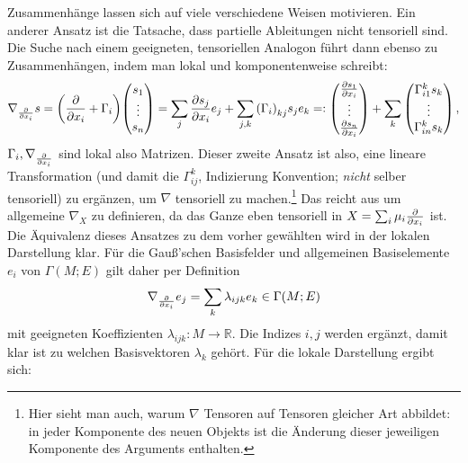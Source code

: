 \documentclass[../H_Analysis_main.tex]{subfiles}
\begin{document}
Zusammenhänge lassen sich auf viele verschiedene Weisen motivieren. Ein anderer Ansatz ist die Tatsache, dass partielle Ableitungen nicht tensoriell sind. Die Suche nach einem geeigneten, tensoriellen Analogon führt dann ebenso zu Zusammenhängen, indem man lokal und komponentenweise schreibt:
\begin{equation}
\nabla_{\pdv{x_i}} s = \qty(\pdv{x_i} + \Gamma_i) \mqty(s_1 \\ \vdots \\ s_n) = \sum_j \pdv{s_j}{x_i} e_j + \sum_{j, k} \qty(\Gamma_i)_{kj} s_j e_k =: \mqty(\pdv{s_1}{x_i} \\ \vdots \\ \pdv{s_n}{x_i}) + \sum_k \mqty(\Gamma_{i1}^k s_k \\ \vdots \\ \Gamma_{in}^k s_k) \, ,
\end{equation}
$\Gamma_i, \nabla_{\pdv{x_i}}$ sind lokal also Matrizen. %
Dieser zweite Ansatz ist also, eine lineare Transformation (und damit die  $\Gamma_{ij}^k$, Indizierung Konvention; \emph{nicht} selber tensoriell) zu ergänzen, um $\nabla$ tensoriell zu machen.\footnote{Hier sieht man auch, warum $\nabla$ Tensoren auf Tensoren gleicher Art abbildet: in jeder Komponente des neuen Objekts ist die Änderung dieser jeweiligen Komponente des Arguments enthalten.} Das reicht aus um allgemeine $\nabla_X$ zu definieren, da das Ganze eben tensoriell in $X = \sum_i \mu_i \pdv{x_i}$ ist. Die Äquivalenz dieses Ansatzes zu dem vorher gewählten wird in der lokalen Darstellung klar. Für die Gauß'schen Basisfelder und allgemeinen Basiselemente $e_i$ von $\Gamma(M; E)$ gilt daher per Definition
\begin{equation}
\nabla_{\pdv{x_i}} e_j = \sum_k \lambda_{ijk} e_k \in \Gamma(M; E)
\end{equation}
mit geeigneten Koeffizienten $\lambda_{ijk}: M \rightarrow \mathbb{R}$. Die Indizes $i, j$ werden ergänzt, damit klar ist zu welchen Basisvektoren $\lambda_k$ gehört. Für die lokale Darstellung ergibt sich:
\end{document}
